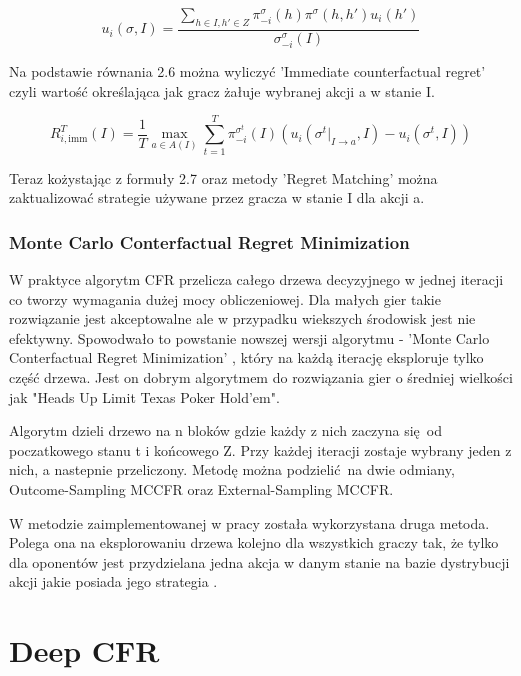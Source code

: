 \documentclass[12pt,oneside,a4paper]{report}
\begin{document}
\begin{equation}
   u_{i} (\sigma, I) = \frac{\sum_{h \in I, h' \in Z} \pi^{\sigma}_{-i} (h) \pi^{\sigma} (h, h')
   u_{i}(h')}{\sigma^{\sigma}_{-i}(I)}
\end{equation}

Na podstawie równania 2.6 można wyliczyć 'Immediate counterfactual regret' czyli wartość określająca
jak gracz żałuje wybranej akcji a w stanie I.

\begin{equation}
   R^{T}_{i,\text{imm}} (I) = \frac{1}{T} \max_{a \in A(I)} \sum^{T}_{t=1} \pi^{\sigma^{t}}_{-i} (I)
   (u_{i}(\sigma^{t}|_{I \rightarrow a}, I) - u_{i}(\sigma^{t}, I))
\end{equation}

Teraz kożystając z formuły 2.7 oraz metody 'Regret Matching' można zaktualizować strategie używane przez gracza w
stanie I dla akcji a.


\subsection{Monte Carlo Conterfactual Regret Minimization}

W praktyce algorytm CFR przelicza całego drzewa decyzyjnego w jednej iteracji co tworzy wymagania
dużej mocy obliczeniowej. Dla małych gier takie rozwiązanie jest akceptowalne ale w przypadku 
wiekszych środowisk jest nie efektywny.
Spowodwało to powstanie nowszej wersji algorytmu - 'Monte Carlo Conterfactual Regret Minimization'
, który na każdą iterację eksploruje tylko część drzewa.
Jest on dobrym algorytmem do rozwiązania gier o średniej 
wielkości jak "Heads Up Limit Texas Poker Hold'em". 

Algorytm dzieli drzewo na n bloków gdzie każdy z nich zaczyna się od poczatkowego stanu t i
końcowego Z. Przy każdej iteracji zostaje wybrany jeden z nich, a nastepnie przeliczony. 
Metodę można podzielić na dwie odmiany, Outcome-Sampling MCCFR oraz External-Sampling MCCFR.

W metodzie zaimplementowanej w pracy została wykorzystana druga metoda. Polega ona na 
eksplorowaniu drzewa kolejno dla wszystkich graczy tak, że tylko dla oponentów jest przydzielana
jedna akcja w danym stanie na bazie dystrybucji akcji jakie posiada jego strategia \cite{mccfr}.



\chapter{Deep CFR}
\end{document}
